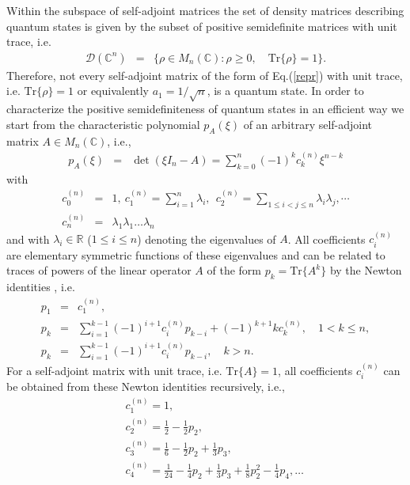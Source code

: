 \documentclass[12pt]{iopart}
\begin{document}
Within the subspace of self-adjoint matrices the set of density matrices describing quantum states is given by
the subset of positive semidefinite matrices with unit trace, i.e.
\begin{eqnarray}
 \mathcal{D}(\mathbb{C}^n)&=&\{\rho \in M_n(\mathbb{C}): \rho \geqslant 0, \quad \mathrm{Tr} \{\rho\}=1 \}.
\end{eqnarray}
Therefore, not every self-adjoint matrix of the form of Eq.(\ref{repr}) with unit trace, i.e. $\mathrm{Tr}\{\rho\} = 1$ or equivalently $a_1 = 1/\sqrt{n}$, is a quantum state. 
In order to characterize the positive semidefiniteness of quantum states in an efficient way we start from
the characteristic polynomial $p_A(\xi)$ of an arbitrary self-adjoint matrix $A \in M_n(\mathbb{C})$, i.e.,
\begin{eqnarray}
 p_A(\xi)&=&\det (\xi I_n-A)=\sum^n_{k=0} (-1)^k c^{(n)}_k \xi^{n-k} \label{chPolynom}
\end{eqnarray}
with
\begin{eqnarray}
 c^{(n)}_0 &=& 1,~
 c^{(n)}_1=\sum^n_{i=1} \lambda_i,~~
 c^{(n)}_2 = \sum_{1\leqslant i <j \leqslant n} \lambda_i\lambda_j,\cdots \nonumber\\
 c^{(n)}_n&=&\lambda_1\lambda_1 \dots \lambda_n
\end{eqnarray}
and with $\lambda_i\in {\mathbb R}$ ($1\leq i\leq n$) denoting the eigenvalues of $A$. All coefficients $c^{(n)}_i$ are elementary symmetric functions of these eigenvalues and can 
be related to traces of powers of the linear operator $A$ of the form
$p_k=\mathrm{Tr} \{A^k\}$ by the Newton identities \cite{Horn}, i.e.
\begin{eqnarray}
 p_1&=&c^{(n)}_1, \nonumber \\
 p_k&=&\sum^{k-1}_{i=1} (-1)^{i+1} c^{(n)}_i p_{k-i}+(-1)^{k+1}k c^{(n)}_k, \quad 1<k\leqslant n, \nonumber \\
 p_k&=&\sum^{k-1}_{i=1} (-1)^{i+1} c^{(n)}_i p_{k-i}, \quad k>n. \label{Newton0}
\end{eqnarray}
For a self-adjoint matrix with unit trace, i.e. $\mathrm{Tr} \{A\}=1$,
all coefficients $c^{(n)}_i$ can be obtained from these Newton identities recursively, i.e., 
\begin{eqnarray}
 &&c^{(n)}_1=1, \label{Newton} \\
 &&c^{(n)}_2=\frac{1}{2}-\frac{1}{2} p_2, \nonumber \\
 &&c^{(n)}_3=\frac{1}{6}-\frac{1}{2} p_2+\frac{1}{3}p_3, \nonumber \\
 &&c^{(n)}_4=\frac{1}{24}-\frac{1}{4} p_2+\frac{1}{3}p_3+\frac{1}{8} p^2_2-\frac{1}{4} p_4,
\dots \nonumber 
\end{eqnarray}
\end{document}
